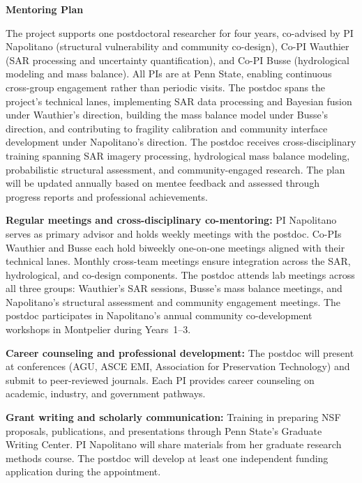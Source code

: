 \documentclass[11pt]{article}
\begin{document}
\pagestyle{empty}

\noindent \textbf{Mentoring Plan}

\vspace{0.15cm}
\noindent The project supports one postdoctoral researcher for four years,
co-advised by PI Napolitano (structural vulnerability and community co-design),
Co-PI Wauthier (SAR processing and uncertainty quantification), and
Co-PI Busse (hydrological modeling and mass balance). All PIs are at Penn State,
enabling continuous cross-group engagement rather than periodic visits.
The postdoc spans the project's technical lanes, implementing SAR data processing
and Bayesian fusion under Wauthier's direction, building the mass balance model
under Busse's direction, and contributing to fragility calibration and community
interface development under Napolitano's direction.
The postdoc receives cross-disciplinary training spanning SAR imagery processing,
hydrological mass balance modeling, probabilistic structural assessment, and
community-engaged research. The plan will be updated annually based on mentee
feedback and assessed through progress reports and professional achievements.

\vspace{0.1cm}
\noindent \textbf{Regular meetings and cross-disciplinary co-mentoring:}
PI Napolitano serves as primary advisor and holds weekly meetings with the postdoc.
Co-PIs Wauthier and Busse each hold biweekly one-on-one meetings aligned with
their technical lanes. Monthly cross-team meetings ensure integration across
the SAR, hydrological, and co-design components. The postdoc attends lab meetings
across all three groups: Wauthier's SAR sessions, Busse's mass balance meetings,
and Napolitano's structural assessment and community engagement meetings.
The postdoc participates in Napolitano's annual community co-development workshops
in Montpelier during Years~1--3.

\vspace{0.1cm}
\noindent \textbf{Career counseling and professional development:}
The postdoc will present at conferences (AGU, ASCE EMI, Association for Preservation
Technology) and submit to peer-reviewed journals. Each PI provides career counseling
on academic, industry, and government pathways.

\vspace{0.1cm}
\noindent \textbf{Grant writing and scholarly communication:}
Training in preparing NSF proposals, publications, and presentations through Penn
State's Graduate Writing Center. PI Napolitano will share materials from her
graduate research methods course. The postdoc will develop at least one independent
funding application during the appointment.
\end{document}
